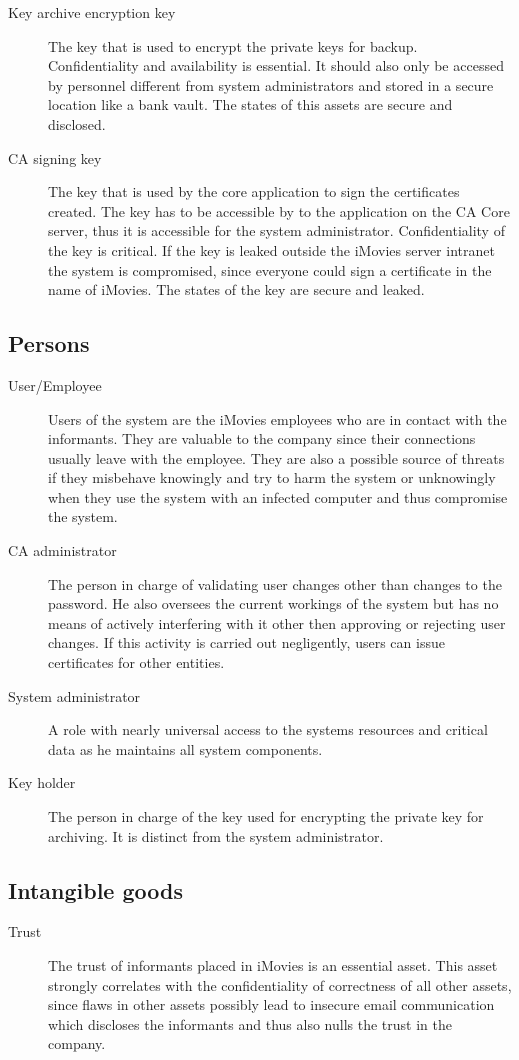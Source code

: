 \documentclass[a4paper, toc=index, 12pt, DIV14, twoside, BCOR2cm, headsepline, numbers=noenddot, bibliography=totoc]{scrbook}
\begin{document}
\begin{description}
\item[Key archive encryption key] The key that is used to encrypt the private keys for backup. Confidentiality and availability is essential. It should also only be accessed by personnel different from system administrators and stored in a secure location like a bank vault. The states of this assets are secure and disclosed.
\item[CA signing key] The key that is used by the core application to sign the certificates created. The key has to be accessible by to the application on the CA Core server, thus it is accessible for the system administrator. Confidentiality of the key is critical. If the key is leaked outside the iMovies server intranet the system is compromised, since everyone could sign a certificate in the name of iMovies. The states of the key are secure and leaked.
\end{description}
\subsection{Persons}
\begin{description}
\item[User/Employee ] Users of the system are the iMovies employees who are in contact with the informants. They are valuable to the company since their connections usually leave with the employee. They are also a possible source of threats if they misbehave knowingly and try to harm the system or unknowingly when they use the system with an infected computer and thus compromise the system.
\item[CA administrator ] The person in charge of validating user changes other than changes to the password. He also oversees the current workings of the system but has no means of actively interfering with it other then approving or rejecting user changes. If this activity is carried out negligently, users can issue certificates for other entities.
\item[System administrator ] A role with nearly universal access to the systems resources and critical data as he maintains all system components.
\item[Key holder ] The person in charge of the key used for encrypting the private key for archiving. It is distinct from the system administrator.
\end{description}

\subsection{Intangible goods}
\begin{description}
\item[Trust ] The trust of informants placed in iMovies is an essential asset. This asset strongly correlates with the confidentiality of correctness of all other assets, since flaws in other assets possibly lead to insecure email communication which discloses the informants and thus also nulls the trust in the company.
\end{description}
\end{document}
